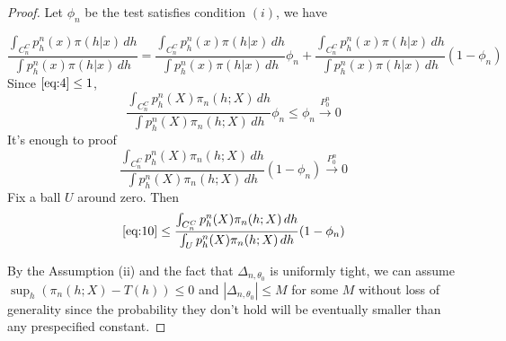\begin{proof}
    Let $\phi_n$ be the test satisfies condition $(i)$, we have

\begin{equation}
    \frac{\int_{C_n^C}p_h^n(x)\pi(h|x)\, dh}{\int p_h^n(x)\pi(h|x)\, dh}= \frac{\int_{C_n^C}p_h^n(x)\pi(h|x)\, dh}{\int p_h^n(x)\pi(h|x)\, dh}\phi_n+ \frac{\int_{C_n^C}p_h^n(x)\pi(h|x)\, dh}{\int p_h^n(x)\pi(h|x)\, dh}(1-\phi_n)
\end{equation}
Since $\eqref{eq:4}\leq 1$, 
\begin{equation}
    \frac{\int_{C_n^C}p_h^n(X)\pi_n(h;X)\, dh}{\int p_h^n(X)\pi_n(h;X)\, dh}\phi_n\leq \phi_n\xrightarrow{P_0^n}0
\end{equation}
It's enough to proof
\begin{equation}\label{eq:10}
    \frac{\int_{C_n^C}p_h^n(X)\pi_n(h;X)\, dh}{\int p_h^n(X)\pi_n(h;X)\, dh}(1-\phi_n)\xrightarrow{P_0^n}0
\end{equation}
Fix a ball $U$ around zero. Then
\begin{equation}\label{eq:11}
\eqref{eq:10}\leq \frac{\int_{C_n^C}p_h^n(X)\pi_n(h;X)\, dh}{\int_U p_h^n(X)\pi_n(h;X)\, dh}(1-\phi_n)
\end{equation}

    By the Assumption (ii) and the fact that $\Delta_{n,\theta_0}$ is uniformly tight, we can assume $\sup_h (\pi_n(h;X)-T(h))\leq 0$ and $|\Delta_{n,\theta_0}|\leq M$ for some $M$ without loss of generality since the probability they don't hold will be eventually smaller than any prespecified constant. 


\end{proof}
